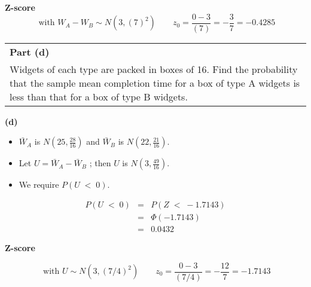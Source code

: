 \documentclass[a4paper,12pt]{article}
\begin{document}
	\begin{framed}
		\noindent \textbf{Z-score}
		\[
		\mbox{ with } W_A -W_B \sim N(3, (7)^2)   \qquad z_{0} = \frac{0-3}{(7)}  = -\frac{3}{7} = -0.4285
		\]
	\end{framed}
	
	\newpage
	\begin{table}
		\begin{tabular}{|p{15cm}|}
			\hline \large
			\noindent  \textbf{Part (d)}\\ \large
			Widgets of each type are packed in boxes of 16. Find the probability that the sample mean completion time for a box of type A widgets is less than that for a
			box of type B widgets.
			\\ \hline
		\end{tabular}
	\end{table}
	\vspace{0.8cm}
	\noindent \textbf{(d)} \\ 
	\begin{itemize}
		\item $\bar{W}_A$ is $N(25, \frac{28}{16})$ and $\bar{W}_B$ is $N(22, \frac{21}{16})$. 
		\item Let $U =\bar{W}_A -\bar{W}_B$ ; then $U$ is  $N(3,\frac{49}{16})$. \item We require $P(U \;<\; 0)$.
	\end{itemize}
	
	
	\begin{eqnarray*}
		P(U \;<\; 0)   &=& P(Z \;<\; - 1.7143) \\
		&=& \Phi(- 1.7143) \\
		&=& 0.0432
	\end{eqnarray*}
	\begin{framed}
		\noindent \textbf{Z-score}
		
		\[\mbox{ with } U \sim N(3, (7/4)^2)   \qquad z_{0} = \frac{0-3}{(7/4)}  = -\frac{12}{7} = -1.7143
		\]
	\end{framed}
\end{document}
